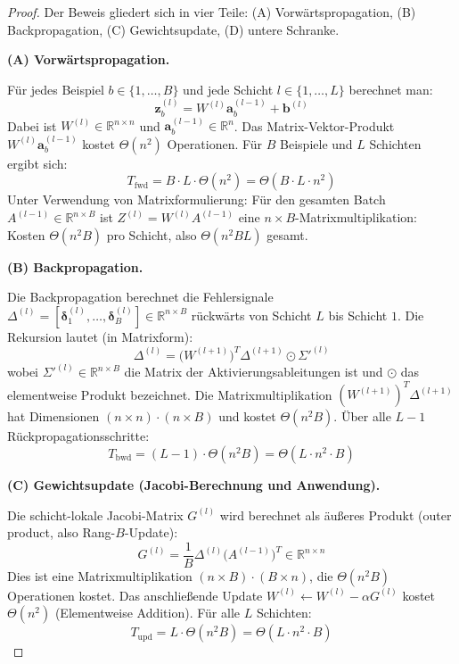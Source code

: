 ﻿\documentclass[a4paper,12pt]{article}
\theoremstyle{definition}
\begin{document}
\begin{proof}
	Der Beweis gliedert sich in vier Teile: (A) Vorwärtspropagation, (B) Backpropagation, (C) Gewichtsupdate, (D) untere Schranke.
	
	\medskip
	\textbf{(A) Vorwärtspropagation.}
	
	Für jedes Beispiel $b \in \{1, \ldots, B\}$ und jede Schicht $l \in \{1, \ldots, L\}$ berechnet man:
	\[
	\boldsymbol{z}^{(l)}_b = W^{(l)} \boldsymbol{a}^{(l-1)}_b + \boldsymbol{b}^{(l)}
	\]
	Dabei ist $W^{(l)} \in \mathbb{R}^{n \times n}$ und $\boldsymbol{a}^{(l-1)}_b \in \mathbb{R}^n$. Das Matrix-Vektor-Produkt $W^{(l)} \boldsymbol{a}^{(l-1)}_b$ kostet $\Theta(n^2)$ Operationen. Für $B$ Beispiele und $L$ Schichten ergibt sich:
	\[
	T_{\mathrm{fwd}} = B \cdot L \cdot \Theta(n^2) = \Theta(B \cdot L \cdot n^2)
	\]
	Unter Verwendung von Matrixformulierung: Für den gesamten Batch $A^{(l-1)} \in \mathbb{R}^{n \times B}$ ist $Z^{(l)} = W^{(l)} A^{(l-1)}$ eine $n \times B$-Matrixmultiplikation: Kosten $\Theta(n^2 B)$ pro Schicht, also $\Theta(n^2 B L)$ gesamt.
	
	\medskip
	\textbf{(B) Backpropagation.}
	
	Die Backpropagation berechnet die Fehlersignale $\Delta^{(l)} = [\boldsymbol{\delta}^{(l)}_1, \ldots, \boldsymbol{\delta}^{(l)}_B] \in \mathbb{R}^{n \times B}$ rückwärts von Schicht $L$ bis Schicht $1$. Die Rekursion lautet (in Matrixform):
	\[
	\Delta^{(l)} = \bigl(W^{(l+1)}\bigr)^T \Delta^{(l+1)} \odot \Sigma'^{(l)}
	\]
	wobei $\Sigma'^{(l)} \in \mathbb{R}^{n \times B}$ die Matrix der Aktivierungsableitungen ist und $\odot$ das elementweise Produkt bezeichnet. Die Matrixmultiplikation $(W^{(l+1)})^T \Delta^{(l+1)}$ hat Dimensionen $(n \times n) \cdot (n \times B)$ und kostet $\Theta(n^2 B)$. Über alle $L-1$ Rückpropagationsschritte:
	\[
	T_{\mathrm{bwd}} = (L-1) \cdot \Theta(n^2 B) = \Theta(L \cdot n^2 \cdot B)
	\]
	
	\medskip
	\textbf{(C) Gewichtsupdate (Jacobi-Berechnung und Anwendung).}
	
	Die schicht-lokale Jacobi-Matrix $G^{(l)}$ wird berechnet als äußeres Produkt (outer product, also Rang-$B$-Update):
	\[
	G^{(l)} = \frac{1}{B} \Delta^{(l)} \bigl(A^{(l-1)}\bigr)^T \in \mathbb{R}^{n \times n}
	\]
	Dies ist eine Matrixmultiplikation $(n \times B) \cdot (B \times n)$, die $\Theta(n^2 B)$ Operationen kostet. Das anschließende Update $W^{(l)} \leftarrow W^{(l)} - \alpha G^{(l)}$ kostet $\Theta(n^2)$ (Elementweise Addition). Für alle $L$ Schichten:
	\[
	T_{\mathrm{upd}} = L \cdot \Theta(n^2 B) = \Theta(L \cdot n^2 \cdot B)
	\]
	

\end{proof}
\end{document}
